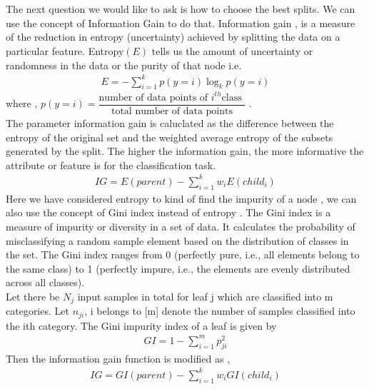\documentclass[12pt,a4paper]{article}
\begin{document}
\section{}
The next question we would like to ask is how to choose the best splits. 
We can use the concept of Information Gain to do that.
Information gain , is a measure of the reduction in entropy (uncertainty) achieved by splitting the data on a particular feature. Entropy$(E)$ tells us the amount of uncertainty or randomness in the data or the purity of that node i.e.    
\begin{align*}
    E = -\sum_{i=1}^k p(y= i)\log_k p(y=i)
\end{align*}
where , $p(y=i) = \dfrac{\text{number of data points of $i^{th}$class }}{\text{total number of data points}}  $ .\\The parameter information gain is caluclated as the difference between the entropy of the original set and the weighted average entropy of the subsets generated by the split. The higher the information gain, the more informative the attribute or feature is for the classification task.
\begin{align*}
    {IG} = E(parent) - \sum_{i=1}^k w_iE(child_i) 
\end{align*}
Here we have considered entropy to kind of find the impurity of a node ,  we can also use the concept of Gini index instead of entropy .
The Gini index is a measure of impurity or diversity in a set of data. It calculates the probability of misclassifying a random sample element based on the distribution of classes in the set. The Gini index ranges from 0 (perfectly pure, i.e., all elements belong to the same class) to 1 (perfectly impure, i.e., the elements are evenly distributed across all classes).\\Let there be $N_j$
input samples in total for leaf j which are classified into m categories.
Let $n_{ji}$, i belongs to [m] denote the number of samples classified into the ith category. The Gini impurity index of a leaf is given by
\begin{align*}
    GI = 1 - \sum_{i=1}^m p_{ji}^2
\end{align*}
Then the information gain function is modified as ,
\begin{align*}
    {IG} = GI(parent) - \sum_{i=1}^k w_iGI(child_i) 
\end{align*}
\end{document}
